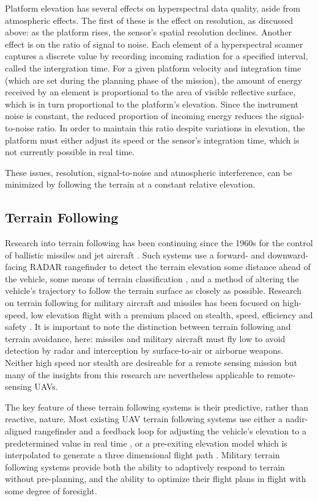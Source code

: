 \documentclass[10pt,a4paper]{report}
\begin{document}
Platform elevation has several effects on hyperspectral data quality, aside from atmospheric effects. The first of these is the effect on resolution, as discussed above: as the platform rises, the sensor's spatial resolution declines. Another effect is on the ratio of signal to noise. Each element of a hyperspectral scanner captures a discrete value by recording incoming radiation for a specified interval, called the intergration time. For a given platform velocity and integration time (which are set during the planning phase of the mission), the amount of energy received by an element is proportional to the area of visible reflective surface, which is in turn proportional to the platform's elevation. Since the instrument noise is constant, the reduced proportion of incoming energy reduces the signal-to-noise ratio. In order to maintain this ratio despite variations in elevation, the platform must either adjust its speed or the sensor's integration time, which is not currently possible in real time.

These issues, resolution, signal-to-noise and atmospheric interference, can be minimized by following the terrain at a constant relative elevation.

\subsection{Terrain Following}

Research into terrain following has been continuing since the 1960s for the control of ballistic missiles and jet aircraft \cite{KRACHMALNICK1968,Starling1971,Cunningham1980}. Such systems use a forward- and downward-facing RADAR rangefinder to detect the terrain elevation some distance ahead of the vehicle, some means of terrain classification \cite{Cunningham1980}, and a method of altering the vehicle's trajectory to follow the terrain surface as closely as possible. Research on terrain following for military aircraft and missiles has been focused on high-speed, low elevation flight with a premium placed on stealth, speed, efficiency and safety \cite{KRACHMALNICK1968}. It is important to note the distinction between terrain following and terrain avoidance, here: missiles and military aircraft must fly low to avoid detection by radar and interception by surface-to-air or airborne weapons. Neither high speed nor stealth are desireable for a remote sensing mission but many of the insights from this research are nevertheless applicable to remote-sensing UAVs.

The key feature of these terrain following systems is their predictive, rather than reactive, nature. Most existing UAV terrain following systems use either a nadir-aligned rangefinder and a feedback loop for adjusting the vehicle's elevation to a predetermined value in real time \cite{ArduPilot2017}, or a pre-exiting elevation model which is interpolated to generate a three dimensional flight path \cite{ArduPilot2017,Samar2011}. Military terrain following systems provide both the ability to adaptively respond to terrain without pre-planning, and the ability to optimize their flight plans in flight with some degree of foresight.
\end{document}
